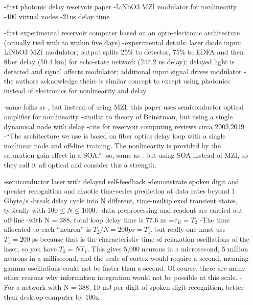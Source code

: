 \vspace{3em}
\cite{laso2012}
-first photonic delay reservoir paper
-LiNbO3 MZI modulator for nonlinearity
-400 virtual nodes
-21us delay time

\cite{padu2012}
-first experimental reservoir computer based on an opto-electronic architecture (actually tied with \cite{laso2012} to within five days)
-experimental details: laser diode input; LiNbO3 MZI modulator; output splits 25\% to detector, 75\% to EDFA and then fiber delay (50.4 km) for echo-state network (247.2 us delay); delayed light is detected and signal affects modulator; additional input signal drives modulator
-the authors acknowledge theirs is similar concept to \cite{apso2011} except using photonics instead of electronics for nonlinearity and delay

\cite{dusc2012}
-same folks as \cite{padu2012}, but instead of using MZI, this paper uses semiconductor optical amplifier for nonlinearity
-similar to theory of Beinstman, but using a single dynamical node with delay
-cite \cite{luja2009,taya2019} for reservoir computing reviews circa 2009,2019
-``The architecture we use is based on fiber optics delay loop with a single nonlinear node and off-line training. The nonlinearity is provided by the saturation gain effect in a SOA.''
-so, same as \cite{laso2012}, but using SOA instead of MZI, so they call it all optical and consider this a strength.

\vspace{3em}
\cite{brso2013}
-semiconductor laser with delayed self-feedback
-demonstrate spoken digit and speaker recognition and chaotic time-series prediction at data rates beyond 1 Gbyte/s
-break delay cycle into N different, time-multiplexed transient states, typically with $100\le N \le 1000$.
-data preprocessing and readout are carried out off-line
-with N = 388, total loop delay time is 77.6 ns =$\tau_D = T_2$
-The time allocated to each ``neuron'' is $T_2/N = 200ps = T_1$, but really one must use $T_1 = 200$\,ps because that is the characteristic time of relaxation oscillations of the laser, so you have $T_2 = NT_1$. This gives 5,000 neurons in a microsecond, 5 million neurons in a millisecond, and the scale of cortex would require a second, meaning gamma oscillations could not be faster than a second. Of course, there are many other reasons why information integration would not be possible at this scale.
-For a network with N = 388, 10 mJ per digit of spoken digit recognition, better than desktop computer by 100x.

